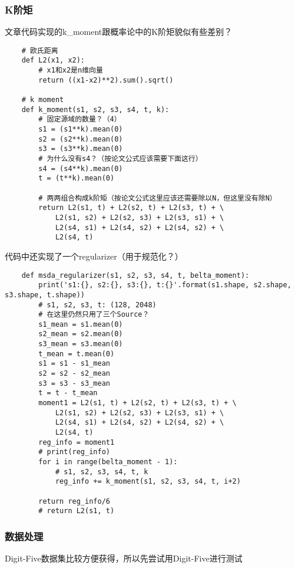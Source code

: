 \documentclass[UTF8]{ctexart}
\begin{document}
            \subsubsection{K阶矩}
                文章代码实现的k\_moment跟概率论中的K阶矩貌似有些差别？
                \begin{verbatim}
    # 欧氏距离
    def L2(x1, x2):
        # x1和x2是n维向量
        return ((x1-x2)**2).sum().sqrt()
    
    # k moment
    def k_moment(s1, s2, s3, s4, t, k):
        # 固定源域的数量？（4）
        s1 = (s1**k).mean(0)
        s2 = (s2**k).mean(0)
        s3 = (s3**k).mean(0)
        # 为什么没有s4？（按论文公式应该需要下面这行）
        s4 = (s4**k).mean(0)
        t = (t**k).mean(0)

        # 两两组合构成k阶矩（按论文公式这里应该还需要除以N，但这里没有除N）
        return L2(s1, t) + L2(s2, t) + L2(s3, t) + \
            L2(s1, s2) + L2(s2, s3) + L2(s3, s1) + \
            L2(s4, s1) + L2(s4, s2) + L2(s4, s2) + \
            L2(s4, t)
                \end{verbatim}

                代码中还实现了一个regularizer（用于规范化？）
                \begin{verbatim}
    def msda_regularizer(s1, s2, s3, s4, t, belta_moment):
        print('s1:{}, s2:{}, s3:{}, t:{}'.format(s1.shape, s2.shape, s3.shape, t.shape))
        # s1, s2, s3, t: (128, 2048)
        # 在这里仍然只用了三个Source？
        s1_mean = s1.mean(0)
        s2_mean = s2.mean(0)
        s3_mean = s3.mean(0)
        t_mean = t.mean(0)
        s1 = s1 - s1_mean
        s2 = s2 - s2_mean
        s3 = s3 - s3_mean
        t = t - t_mean
        moment1 = L2(s1, t) + L2(s2, t) + L2(s3, t) + \
            L2(s1, s2) + L2(s2, s3) + L2(s3, s1) + \
            L2(s4, s1) + L2(s4, s2) + L2(s4, s2) + \
            L2(s4, t)
        reg_info = moment1
        # print(reg_info)
        for i in range(belta_moment - 1):
            # s1, s2, s3, s4, t, k
            reg_info += k_moment(s1, s2, s3, s4, t, i+2)

        return reg_info/6
        # return L2(s1, t)
                \end{verbatim}
            \subsubsection{数据处理}
                Digit-Five数据集比较方便获得，所以先尝试用Digit-Five进行测试
\end{document}
